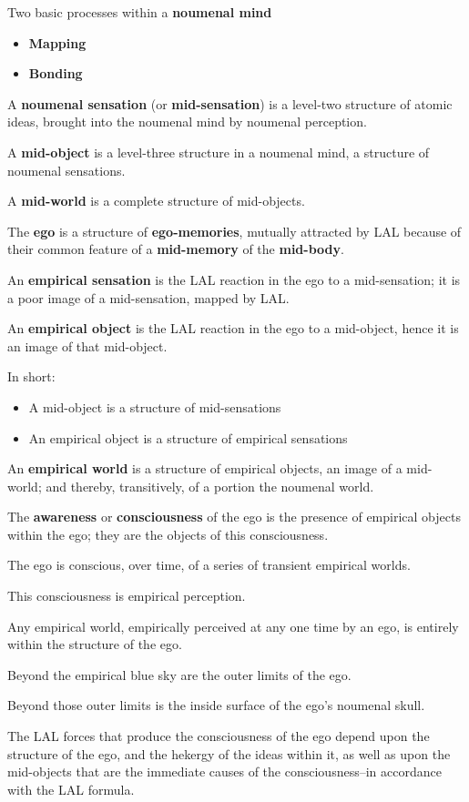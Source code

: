 \documentclass[11pt]{article}
\begin{document}
Two basic processes within a \textbf{noumenal mind}
\begin{itemize}
\item \textbf{Mapping}
\item \textbf{Bonding}
\end{itemize}
A \textbf{noumenal sensation} (or \textbf{mid-sensation}) is a level-two
structure of atomic ideas, brought into the noumenal mind
by noumenal perception.

A \textbf{mid-object} is a level-three structure in a noumenal mind,
a structure of noumenal sensations.

A \textbf{mid-world} is a complete structure of mid-objects. 

The \textbf{ego} is a structure of \textbf{ego-memories}, mutually
attracted by LAL because of their common feature of
a \textbf{mid-memory} of the \textbf{mid-body}.

An \textbf{empirical sensation} is the LAL reaction in the ego
to a mid-sensation; it is a poor image of a mid-sensation,
mapped by LAL.

An \textbf{empirical object} is the LAL reaction in the ego to a
mid-object, hence it is an image of that mid-object.

In short:
\begin{itemize}
\item A mid-object is a structure of mid-sensations
\item An empirical object is a structure of empirical sensations
\end{itemize}
An \textbf{empirical world} is a structure of empirical objects, an
image of a mid-world; and thereby, transitively, of a portion
the noumenal world.

The \textbf{awareness} or \textbf{consciousness} of the ego is the
presence of empirical objects within the ego; they are the objects
of this consciousness.

The ego is conscious, over time, of a series of transient empirical worlds.

This consciousness is empirical perception.

Any empirical world, empirically perceived at any one time by an ego,
is entirely within the structure of the ego.

Beyond the empirical blue sky are the outer limits of the ego.

Beyond those outer limits is the inside surface of the ego's noumenal skull.

The LAL forces that produce the consciousness of the ego
depend upon the structure of the ego, and the hekergy of the 
ideas within it, as well as upon the mid-objects that are 
the immediate causes of the consciousness--in accordance
with the LAL formula.
\end{document}
